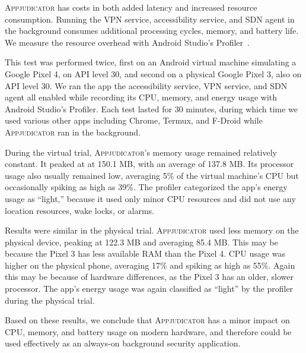 \textsc{Appjudicator} has costs in both added latency and increased resource
consumption. Running the VPN service, accessibility service, and SDN agent in
the background consumes additional processing cycles, memory, and battery life.
We measure the resource overhead with Android Studio's
Profiler~\cite{androidprofiler}.

This test was performed twice, first on an Android virtual machine simulating a
Google Pixel 4, on API level 30, and second on a physical Google Pixel 3, also
on API level 30. We ran the app the accessibility service, VPN service, and SDN
agent all enabled while recording its CPU, memory, and energy usage with Android
Studio's Profiler. Each test lasted for 30 minutes, during which time we used
various other apps including Chrome, Termux, and F-Droid while
\textsc{Appjudicator} ran in the background.

During the virtual trial, \textsc{Appjudicator}'s memory usage remained
relatively constant. It peaked at at 150.1 MB, with an average of 137.8 MB. Its
processor usage also usually remained low, averaging 5\% of the virtual
machine's CPU but occasionally spiking as high as 39\%. The profiler categorized
the app's energy usage as ``light,'' because it used only minor CPU resources
and did not use any location resources, wake locks, or alarms.

Results were similar in the physical trial. \textsc{Appjudicator} used less
memory on the physical device, peaking at 122.3 MB and averaging 85.4 MB. This
may be because the Pixel 3 has less available RAM than the Pixel 4. CPU usage
was higher on the physical phone, averaging 17\% and spiking as high as 55\%.
Again this may be because of hardware differences, as the Pixel 3 has an older,
slower processor. The app's energy usage was again classified as ``light'' by
the profiler during the physical trial. 

Based on these results, we conclude that \textsc{Appjudicator} has a minor
impact on CPU, memory, and battery usage on modern hardware, and therefore could
be used effectively as an always-on background security application.

\newpage

